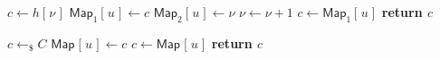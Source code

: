 \documentclass[10pt, psamsfonts, reqno]{amsart}
\theoremstyle{definition}
\theoremstyle{remark}
\numberwithin{equation}{section}
\begin{document}
\begin{minipage}[t]{0.46\textwidth}
\begin{algorithm}[H]
    \centering
    \caption{$\mathcal{O}^{\mathsf{hash}}(u)$}\label{alg_hash_oracle}
    \begin{algorithmic}
        \vspace{2pt}
            \State
            	$c \leftarrow h[\hspace{1pt}\nu\hspace{1pt}]$\vspace{3pt}
        	\State
        		$\mathsf{Map}_1[\hspace{1pt}u\hspace{1pt}]
        		\leftarrow c$\vspace{3pt}
        		\State
        		$\mathsf{Map}_2[\hspace{1pt}u\hspace{1pt}]
        		\leftarrow \nu$\vspace{3pt}
        	\State
        		$\nu \leftarrow \nu + 1$\vspace{0pt}
        \Else
        	\State
        		$c \leftarrow \mathsf{Map}_1
        		[\hspace{1pt}u\hspace{1pt}]$\vspace{0pt}
        \EndIf
        \State \textbf{return $c$}
    \end{algorithmic}
\end{algorithm}
\vspace{0pt}
\end{minipage}
\hfill
\begin{minipage}[t]{0.46\textwidth}
\begin{algorithm}[H]
    \centering
    \caption{$H(u)$}\label{alg_random_oracle}
    \begin{algorithmic}
        \vspace{2pt}
        	\State
        		$c \leftarrow_\$ C$\vspace{4pt}
        	\State
        		$\mathsf{Map}\hspace{1pt}
        		[\hspace{1pt}u\hspace{1pt}] \leftarrow c$
        \Else
        	\State
        		$c \leftarrow \mathsf{Map}
        		\hspace{1pt}[\hspace{1pt}u\hspace{1pt}]$
        \EndIf
        \State \textbf{return $c$}
    \end{algorithmic}
\end{algorithm}
\vspace{0pt}
\end{minipage}
\end{document}
